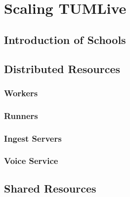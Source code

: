 
\chapter{Scaling TUMLive}\label{chapter:introduction}

\section{Introduction of Schools}

\section{Distributed Resources}
\subsection{Workers}
\subsection{Runners}
\subsection{Ingest Servers}
\subsection{Voice Service}

\section{Shared Resources}
